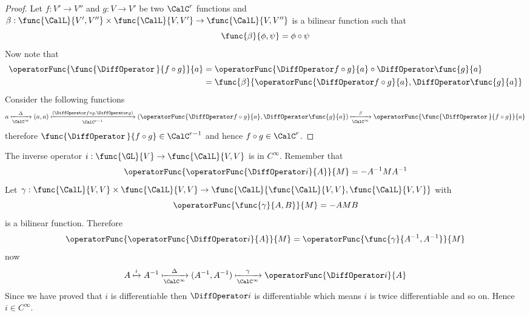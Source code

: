 \begin{proof}
    Let \(f: V' \to V''\) and \(g: V \to V'\) be two \(\CalC^r\) functions and  \(\beta : \func{\CalL}{V',V''} \times \func{\CalL}{V,V'} \to \func{\CalL}{V,V''}\) is a bilinear function such that
    \begin{equation*}
        \func{\beta}{\phi,\psi} = \phi \circ \psi
    \end{equation*}
    Now note that
    \begin{align*}
        \operatorFunc{\func{\DiffOperator \,}{ f \circ g}}{a} & = \operatorFunc{\DiffOperator f \circ g}{a}\circ \DiffOperator \func{g}{a}            \\
                                                              & = \func{\beta }{\operatorFunc{\DiffOperator f \circ g}{a}, \DiffOperator \func{g}{a}}
    \end{align*}
    Consider the following functions
    \begin{equation*}
        a \xmapsto[\CalC^\infty]{\Delta} (a,a) \xmapsto[\CalC^{r-1}]{(\DiffOperator f \circ g, \DiffOperator g)} (\operatorFunc{\DiffOperator f \circ g}{a}, \DiffOperator \func{g}{a}) \xmapsto[\CalC^\infty]{\beta}  \operatorFunc{\func{\DiffOperator \,}{ f \circ g}}{a}
    \end{equation*}
    therefore \(\func{\DiffOperator \,}{ f \circ g} \in \CalC^{r-1}\) and hence \(f \circ g \in \CalC^{r}\).
\end{proof}

\begin{example}
    The inverse operator \(i : \func{\GL}{V} \to \func{\CalL}{V,V}\) is in \(C^\infty\). Remember that
    \begin{equation*}
        \operatorFunc{\operatorFunc{\DiffOperator i}{A}}{M} = - A^{-1}M A^{-1}
    \end{equation*}
    Let \(\gamma : \func{\CalL}{V,V} \times \func{\CalL}{V,V} \to \func{\CalL}{\func{\CalL}{V,V} , \func{\CalL}{V,V}}\) with
    \begin{equation*}
        \operatorFunc{\func{\gamma}{A,B}}{M} = - AMB
    \end{equation*}
    is a bilinear function. Therefore
    \begin{equation*}
        \operatorFunc{\operatorFunc{\DiffOperator i}{A}}{M} = \operatorFunc{\func{\gamma}{A^{-1},A^{-1}}}{M}
    \end{equation*}
    now
    \begin{equation*}
        A \xmapsto{i} A^{-1} \xmapsto[\CalC^\infty]{\Delta} (A^{-1}, A^{-1}) \xmapsto[\CalC^\infty]{\gamma} \operatorFunc{\DiffOperator i}{A}
    \end{equation*}
    Since we have proved that \(i\) is differentiable then \(\DiffOperator i\) is differentiable which means \(i\) is twice differentiable and so on. Hence \(i \in C^{\infty}\).
\end{example}

